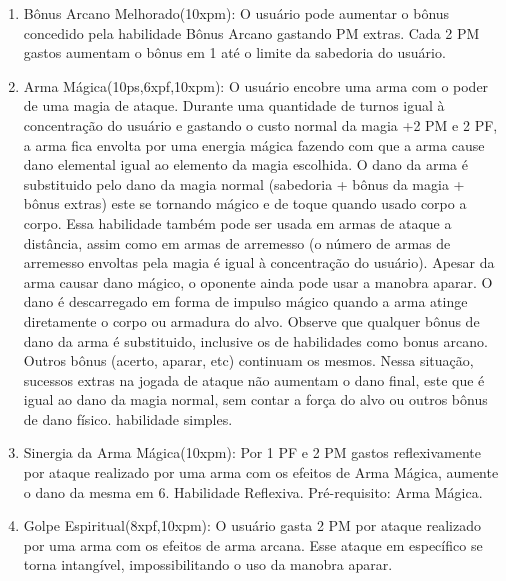 \begin{enumerate}
  \item Bônus Arcano Melhorado(10xpm): O usuário pode aumentar o bônus concedido pela habilidade Bônus Arcano gastando PM extras. Cada 2 PM gastos aumentam o bônus em 1 até o limite da sabedoria do usuário. 
  
    
  \item Arma Mágica(10ps,6xpf,10xpm): O usuário encobre uma arma com o poder de uma magia de ataque. Durante uma quantidade de turnos igual à concentração do usuário e gastando o custo normal da magia +2 PM e 2 PF, a arma fica envolta por uma energia mágica fazendo com que a arma cause dano elemental igual ao elemento da magia escolhida. O dano da arma é substituido pelo dano da magia normal (sabedoria + bônus da magia + bônus extras) este se tornando mágico e de toque quando usado corpo a corpo. Essa habilidade também pode ser usada em armas de ataque a distância, assim como em armas de arremesso (o número de armas de arremesso envoltas pela magia é igual à concentração do usuário). Apesar da arma causar dano mágico, o oponente ainda pode usar a manobra aparar. O dano é descarregado em forma de impulso mágico quando a arma atinge diretamente o corpo ou armadura do alvo. Observe que qualquer bônus de dano da arma é substituido, inclusive os de habilidades como bonus arcano. Outros bônus (acerto, aparar, etc) continuam os mesmos. Nessa situação, sucessos extras na jogada de ataque não aumentam o dano final, este que é igual ao dano da magia normal, sem contar a força do alvo ou outros bônus de dano físico. habilidade simples. 
  
  \item Sinergia da Arma Mágica(10xpm): Por 1 PF e 2 PM gastos reflexivamente por ataque realizado por uma arma com os efeitos de Arma Mágica, aumente o dano da mesma em 6. Habilidade Reflexiva. Pré-requisito: Arma Mágica. 
  
  \item Golpe Espiritual(8xpf,10xpm): O usuário gasta 2 PM por ataque realizado por uma arma com os efeitos de arma arcana. Esse ataque em específico se torna intangível, impossibilitando o uso da manobra aparar.    
    	

\end{enumerate}
